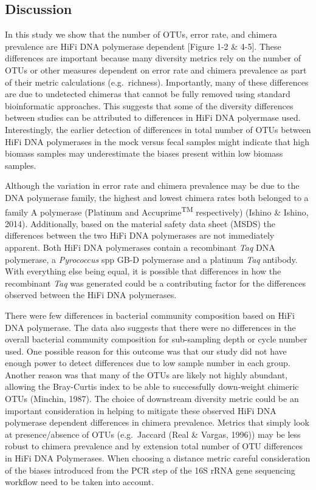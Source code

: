 \documentclass[12pt,]{article}
\begin{document}
\newpage

\subsection{Discussion}\label{discussion}

In this study we show that the number of OTUs, error rate, and chimera
prevalence are HiFi DNA polymerase dependent {[}Figure 1-2 \& 4-5{]}.
These differences are important because many diversity metrics rely on
the number of OTUs or other measures dependent on error rate and chimera
prevalence as part of their metric calculations (e.g.~richness).
Importantly, many of these differences are due to undetected chimeras
that cannot be fully removed using standard bioinformatic approaches.
This suggests that some of the diversity differences between studies can
be attributed to differences in HiFi DNA polyermase used. Interestingly,
the earlier detection of differences in total number of OTUs between
HiFi DNA polymerases in the mock versus fecal samples might indicate
that high biomass samples may underestimate the biases present within
low biomass samples.

Although the variation in error rate and chimera prevalence may be due
to the DNA polymerase family, the highest and lowest chimera rates both
belonged to a family A polymerase (Platinum and
Accuprime\textsuperscript{TM} respectively) (Ishino \& Ishino, 2014).
Additionally, based on the material safety data sheet (MSDS) the
differences between the two HiFi DNA polymerases are not immediately
apparent. Both HiFi DNA polymerases contain a recombinant \emph{Taq} DNA
polymerase, a \emph{Pyrococcus} spp GB-D polymerase and a platinum
\emph{Taq} antibody. With everything else being equal, it is possible
that differences in how the recombinant \emph{Taq} was generated could
be a contributing factor for the differences observed between the HiFi
DNA polymerases.

There were few differences in bacterial community composition based on
HiFi DNA polymerase. The data also suggests that there were no
differences in the overall bacterial community composition for
sub-sampling depth or cycle number used. One possible reason for this
outcome was that our study did not have enough power to detect
differences due to low sample number in each group. Another reason was
that many of the OTUs are likely not highly abundant, allowing the
Bray-Curtis index to be able to successfully down-weight chimeric OTUs
(Minchin, 1987). The choice of downstream diversity metric could be an
important consideration in helping to mitigate these observed HiFi DNA
polymerase dependent differences in chimera prevalence. Metrics that
simply look at presence/absence of OTUs (e.g.~Jaccard (Real \& Vargas,
1996)) may be less robust to chimera prevalence and by extension total
number of OTU differences in HiFi DNA Polymerases. When choosing a
distance metric careful consideration of the biases introduced from the
PCR step of the 16S rRNA gene sequencing workflow need to be taken into
account.
\end{document}
